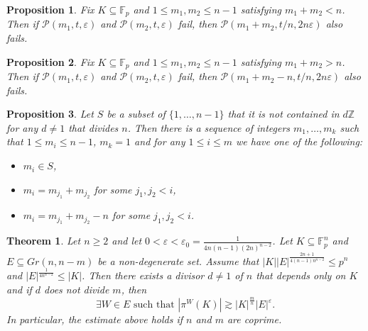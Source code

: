 \documentclass[10pt,a4paper]{amsart}
\newtheorem{theorem}{Theorem}
\newtheorem{proposition}{Proposition}
\newcommand{\F}{\mathbb F}
\begin{document}
\begin{proposition}\label{additionofDimensionsProposition}
    Fix $K \subseteq \F_p$ and $1 \leq m_1, m_2 \leq n - 1$ satisfying $m_1 + m_2 < n$. Then if $\mathcal{P}(m_1, t, \varepsilon)$ and $\mathcal{P}(m_2, t, \varepsilon)$ fail, then $\mathcal{P}(m_1 + m_2, t/n, 2n\varepsilon)$ also fails.
\end{proposition}

\begin{proposition}\label{additionofCodimensionsProposition}
Fix $K \subseteq \F_p$ and $1 \leq m_1, m_2 \leq n - 1$ satisfying $m_1 + m_2 > n$. Then if $\mathcal{P}(m_1, t, \varepsilon)$ and $\mathcal{P}(m_2, t, \varepsilon)$ fail, then $\mathcal{P}(m_1 + m_2 - n, t/n, 2n\varepsilon)$ also fails.   
\end{proposition}

\begin{proposition}\label{sequenceProposition}
    Let $S$ be a subset of $\{1, \ldots, n - 1\}$ that it is not contained in $d \mathbb{Z}$ for any $d \neq 1$ that divides $n$. Then there is a sequence of integers $m_1, \ldots, m_k$ such that $1 \leq m_i \leq n - 1$, $m_k = 1$ and for any $1 \leq i \leq m$ we have one of the following:
    \begin{itemize}
        \item $m_i \in S$,
        \item $m_i = m_{j_1} + m_{j_2}$ for some $j_1, j_2 < i$,
        \item $m_i = m_{j_1} + m_{j_2} - n$ for some $j_1, j_2 < i$.
    \end{itemize}
\end{proposition}

\begin{theorem}\label{BourgainTypeProjections}
Let $n \geq 2$ and let $0<\varepsilon < \varepsilon_0 = \frac{1}{4n(n - 1)(2n)^{n - 2}}$. Let $K \subseteq \F_p^n$ and  $E \subseteq Gr(n, n - m)$ be a non-degenerate set. Assume that $|K| |E|^{\frac{2n + 1}{4(n - 1)n^{n - 2}}} \leq p^n$ and $|E|^{\frac{1}{4 n^{n - 2}}} \leq |K|$. Then there exists a divisor $d \neq 1$ of $n$ that depends only on $K$ and if $d$ does not divide $m$, then 
$$\exists W \in E \text{ such that } |\pi^{W}(K)| \gtrsim |K|^{\frac{m}{n}}|E|^{\varepsilon}.$$
In particular, the estimate above holds if $n$ and $m$ are coprime.
\end{theorem}
\end{document}
